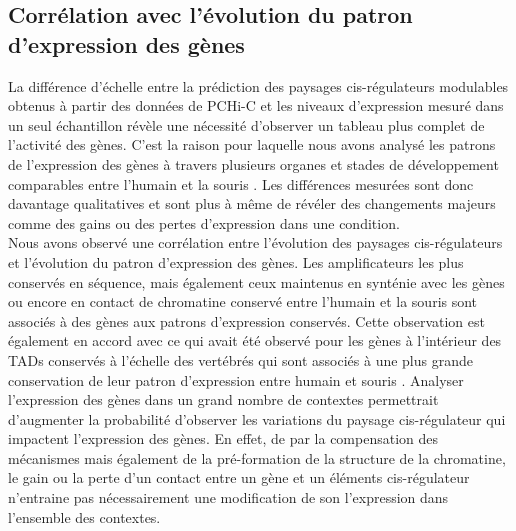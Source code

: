 \subsection{Corrélation avec l’évolution du patron d’expression des gènes}
La différence d’échelle entre la prédiction des paysages \gls{cis}-régulateurs modulables obtenus à partir des données de \acrshort{PCHi-C} et les niveaux d’expression mesuré dans un seul échantillon révèle une nécessité d’observer un tableau plus complet de l’activité des gènes. C’est la raison pour laquelle nous avons analysé les patrons de l’expression des gènes à travers plusieurs organes et stades de développement comparables entre l’humain et la souris \citep{cardoso-moreira_gene_2019}. Les différences mesurées sont donc davantage qualitatives et sont plus à même de révéler des changements majeurs comme des gains ou des pertes d’expression dans une \gls{condition}. \\

Nous avons observé une corrélation entre l’évolution des paysages \gls{cis}-régulateurs et l’évolution du patron d’expression des gènes. Les \glspl{amplificateur} les plus conservés en séquence, mais également ceux maintenus en synténie avec les gènes ou encore en contact de chromatine conservé entre l’humain et la souris sont associés à des gènes aux patrons d’expression conservés. Cette observation est également en accord avec ce qui avait été observé pour les gènes à l’intérieur des \acrshort{TAD}s conservés à l’échelle des vertébrés qui sont associés à une plus grande conservation de leur patron d’expression entre humain et souris \citep{krefting_evolutionary_2018}. Analyser l’expression des gènes dans un grand nombre de contextes permettrait d’augmenter la probabilité d’observer les variations du paysage \gls{cis}-régulateur qui impactent l’expression des gènes. En effet, de par la compensation des mécanismes mais également de la pré-formation de la structure de la chromatine, le gain ou la perte d’un contact entre un gène et un éléments \gls{cis}-régulateur n’entraine pas nécessairement une modification de son l’expression dans l’ensemble des contextes. 

